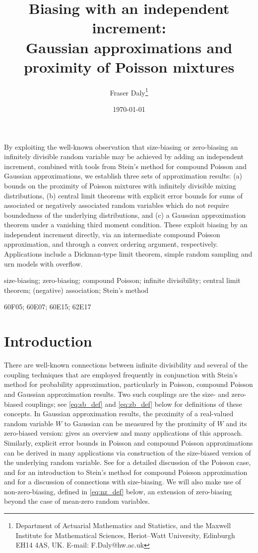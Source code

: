 \documentclass[12pt]{article}
\title{Biasing with an independent increment:\\ Gaussian approximations and proximity of Poisson mixtures} \author{Fraser Daly\footnote{Department of Actuarial Mathematics and Statistics, and the Maxwell Institute for Mathematical Sciences, Heriot--Watt University, Edinburgh EH14 4AS, UK.  E-mail: F.Daly@hw.ac.uk}} \date{\today}
\begin{document}
\maketitle

By exploiting the well-known observation that size-biasing or zero-biasing an infinitely divisible random variable may be achieved by adding an independent increment, combined with tools from Stein's method for compound Poisson and Gaussian approximations, we establish three sets of approximation results: (a) bounds on the proximity of Poisson mixtures with infinitely divisible mixing distributions, (b) central limit theorems with explicit error bounds for sums of associated or negatively associated random variables which do not require boundedness of the underlying distributions, and (c) a Gaussian approximation theorem under a vanishing third moment condition. These exploit biasing by an independent increment directly, via an intermediate compound Poisson approximation, and through a convex ordering argument, respectively. Applications include a Dickman-type limit theorem, simple random sampling and urn models with overflow. 
\vspace{12pt}

 size-biasing; zero-biasing; compound Poisson; infinite divisibility; central limit theorem; (negative) association; Stein's method

\vspace{12pt}

 60F05; 60E07; 60E15; 62E17

\section{Introduction}\label{sec:intro}

There are well-known connections between infinite divisibility and several of the coupling techniques that are employed frequently in conjunction with Stein's method for probability approximation, particularly in Poisson, compound Poisson and Gaussian approximation results. Two such couplings are the size- and zero-biased couplings; see \eqref{eq:sb_def} and \eqref{eq:zb_def} below for definitions of these concepts. In Gaussian approximation results, the proximity of a real-valued random variable $W$ to Gaussian can be measured by the proximity of $W$ and its zero-biased version: \cite{chen11} gives an overview and many applications of this approach. Similarly, explicit error bounds in Poisson and compound Poisson approximations can be derived in many applications via construction of the size-biased version of the underlying random variable. See \cite{barbour92_book} for a detailed discussion of the Poisson case, and \cite{barbour92_paper} for an introduction to Stein's method for compound Poisson approximation and \cite{daly13} for a discussion of connections with size-biasing. We will also make use of non-zero-biasing, defined in \eqref{eq:nz_def} below, an extension of zero-biasing beyond the case of mean-zero random variables. 
\end{document}
